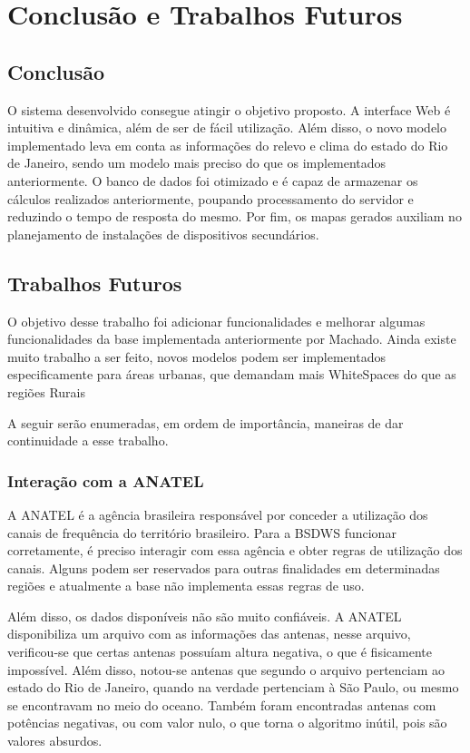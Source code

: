 \chapter{Conclusão e Trabalhos Futuros}

\section{Conclusão}

O sistema desenvolvido consegue atingir o objetivo proposto. A interface Web é intuitiva e dinâmica, além de ser de fácil utilização. Além disso, o novo modelo implementado leva em conta as informações do relevo e clima do estado do Rio de Janeiro, sendo um modelo mais preciso do que os implementados anteriormente. O banco de dados foi otimizado e é capaz de armazenar os cálculos realizados anteriormente, poupando processamento do servidor e reduzindo o tempo de resposta do mesmo. Por fim, os mapas gerados auxiliam no planejamento de instalações de dispositivos secundários.

\section{Trabalhos Futuros}

O objetivo desse trabalho foi adicionar funcionalidades e melhorar algumas funcionalidades da base implementada anteriormente por Machado. Ainda existe muito trabalho a ser feito, novos modelos podem ser implementados especificamente para áreas urbanas, que demandam mais WhiteSpaces do que as regiões Rurais

A seguir serão enumeradas, em ordem de importância, maneiras de dar continuidade a esse trabalho.

\subsection{Interação com a ANATEL}

A ANATEL é a agência brasileira responsável por conceder a utilização dos canais de frequência do território brasileiro. Para a BSDWS funcionar corretamente, é preciso interagir com essa agência e obter regras de utilização dos canais. Alguns podem ser reservados para outras finalidades em determinadas regiões e atualmente a base não implementa essas regras de uso.

Além disso, os dados disponíveis não são muito confiáveis. A ANATEL disponibiliza um arquivo com as informações das antenas, nesse arquivo, verificou-se que certas antenas possuíam altura negativa, o que é fisicamente impossível. Além disso, notou-se antenas que segundo o arquivo pertenciam ao estado do Rio de Janeiro, quando na verdade pertenciam à São Paulo, ou mesmo se encontravam no meio do oceano. Também foram encontradas antenas com potências negativas, ou com valor nulo, o que torna o algoritmo inútil, pois são valores absurdos.

